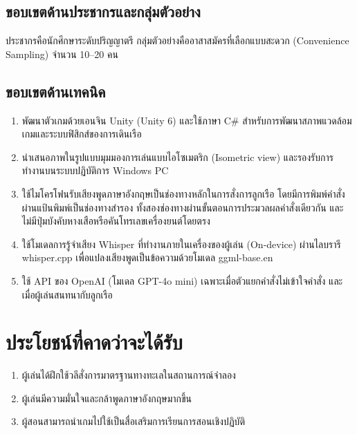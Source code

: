 \subsection{ขอบเขตด้านประชากรและกลุ่มตัวอย่าง}

ประชากรคือนักศึกษาระดับปริญญาตรี กลุ่มตัวอย่างคืออาสาสมัครที่เลือกแบบสะดวก (Convenience Sampling) จำนวน 10--20 คน

\subsection{ขอบเขตด้านเทคนิค}

\begin{enumerate}[label=\arabic*)]
    \item พัฒนาตัวเกมด้วยเอนจิน Unity (Unity 6) และใช้ภาษา C\# สำหรับการพัฒนาสภาพแวดล้อมเกมและระบบฟิสิกส์ของการเดินเรือ
    \item นำเสนอภาพในรูปแบบมุมมองการเล่นแบบไอโซเมตริก (Isometric view) และรองรับการทำงานบนระบบปฏิบัติการ Windows PC
    \item ใช้ไมโครโฟนรับเสียงพูดภาษาอังกฤษเป็นช่องทางหลักในการสั่งการลูกเรือ โดยมีการพิมพ์คำสั่งผ่านแป้นพิมพ์เป็นช่องทางสำรอง ทั้งสองช่องทางผ่านขั้นตอนการประมวลผลคำสั่งเดียวกัน และไม่มีปุ่มบังคับหางเสือหรือคันโทรเลขเครื่องยนต์โดยตรง
    \item ใช้โมเดลการรู้จำเสียง Whisper ที่ทำงานภายในเครื่องของผู้เล่น (On-device) ผ่านไลบรารี whisper.cpp เพื่อแปลงเสียงพูดเป็นข้อความด้วยโมเดล ggml-base.en
    \item ใช้ API ของ OpenAI (โมเดล GPT-4o mini) เฉพาะเมื่อตัวแยกคำสั่งไม่เข้าใจคำสั่ง และเมื่อผู้เล่นสนทนากับลูกเรือ
\end{enumerate}

\section{ประโยชน์ที่คาดว่าจะได้รับ}

\begin{enumerate}[label=\arabic*)]
    \item ผู้เล่นได้ฝึกใช้วลีสั่งการมาตรฐานทางทะเลในสถานการณ์จำลอง
    \item ผู้เล่นมีความมั่นใจและกล้าพูดภาษาอังกฤษมากขึ้น
    \item ผู้สอนสามารถนำเกมไปใช้เป็นสื่อเสริมการเรียนการสอนเชิงปฏิบัติ
\end{enumerate}